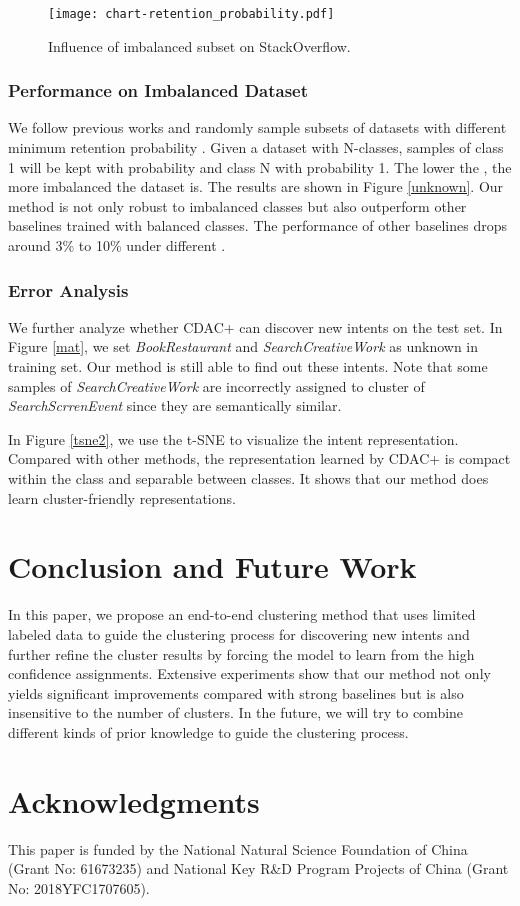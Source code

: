 \documentclass[letterpaper]{article} \usepackage{aaai20}  \usepackage{times}  \usepackage{helvet} \usepackage{courier}  \usepackage[hyphens]{url}  \usepackage{graphicx} \urlstyle{rm} \def\UrlFont{\rm}  \usepackage{graphicx}  \frenchspacing  \setlength{\pdfpagewidth}{8.5in}  \setlength{\pdfpageheight}{11in}
\begin{document}
\begin{figure}[t!]
  \centering  
  \texttt{[image: chart-retention\_probability.pdf]}
  \caption{\label{retention_probability} Influence of imbalanced subset on StackOverflow.}
\end{figure}


\subsubsection{Performance on Imbalanced Dataset}
We follow previous works \cite{chang2017deep} and randomly sample subsets of datasets with different minimum retention probability . Given a dataset with N-classes, samples of class 1 will be kept with probability  and class N with probability 1. The lower the , the more imbalanced the dataset is. The results are shown in Figure \ref{unknown}. Our method is not only robust to imbalanced classes but also outperform other baselines trained with balanced classes. The performance of other baselines drops around 3\% to 10\% under different .

\subsubsection{Error Analysis}
We further analyze whether CDAC+ can discover new intents on the test set. In Figure \ref{mat}, we set \textit{BookRestaurant} and \textit{SearchCreativeWork} as unknown in training set. Our method is  still able to find out these intents. Note that some samples of \textit{SearchCreativeWork} are incorrectly assigned to cluster of \textit{SearchScrrenEvent} since they are semantically similar. 

In Figure \ref{tsne2}, we use the t-SNE \cite{maaten2008visualizing} to visualize the intent representation. Compared with other methods, the representation learned by CDAC+ is compact within the class and separable between classes. It shows that our method does learn cluster-friendly representations.

\section{Conclusion and Future Work}
In this paper, we propose an end-to-end clustering method that uses limited labeled data to guide the clustering process for discovering new intents and further refine the cluster results by forcing the model to learn from the high confidence assignments. Extensive experiments show that our method not only yields significant improvements compared with strong baselines but is also insensitive to the number of clusters. In the future, we will try to combine different kinds of prior knowledge to guide the clustering process.

\section{Acknowledgments}
This paper is funded by the National Natural Science Foundation of China (Grant No: 61673235) and National Key R\&D Program Projects of China (Grant No: 2018YFC1707605).

\small 

\end{document}
